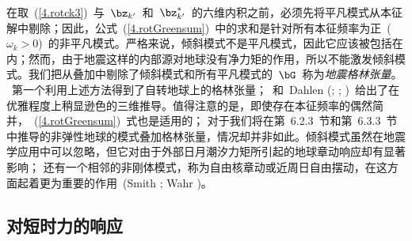 {在取~(\ref{4.rotck3})~与~$\bz_{k'}$~和~$\bz_{k'}^*$~的六维内积之前，必须先将平凡模式从本征解中剔除；因此，公式~(\ref{4.rotGreensum})~中的求和是针对所有本征频率为正~($\omega_k>0$)~的非平凡模式。严格来说，倾斜模式不是平凡模式，因此它应该被包括在内；然而，由于地震这样的内部源对地球没有净力矩的作用，所以不能激发倾斜模式。我们把从叠加中剔除了倾斜模式和所有平凡模式的~$\bG$~称为{\em 地震格林张量\/}。
%
%
\textcite{wahr81a}~第一个利用上述方法得到了自转地球上的格林张量；\textcite{dahlen&smith75}~和~Dahlen (\citeyear{dahlen77};
\citeyear{dahlen78}; \citeyear{dahlen80})~给出了在优雅程度上稍显逊色的三维推导。值得注意的是，即使存在本征频率的偶然简并，~(\ref{4.rotGreensum})~式也是适用的；
%
%
对于我们将在第~6.2.3~节和第~6.3.3~节中推导的非弹性地球的模式叠加格林张量，情况却并非如此。倾斜模式虽然在地震学应用中可以忽略，但它对由于外部日月潮汐力矩所引起的地球章动响应却有显著影响；
%
%
%
还有一个相邻的非刚体模式，称为自由核章动或近周日自由摆动，在这方面起着更为重要的作用~(Smith \citeyear{smith77}; Wahr \citeyear{wahr81c})。
%
%
%

\renewcommand{\thesubsection}{$\!\!\!\raise1.3ex\hbox{$\star$}\!\!$
\arabic{chapter}.\arabic{section}.\arabic{subsection}}
\subsection{对短时力的响应}
%
%
\label{4.sec.rottrans}
\renewcommand{\thesubsection}{\arabic{chapter}.\arabic{section}.\arabic{subsection}}

}
